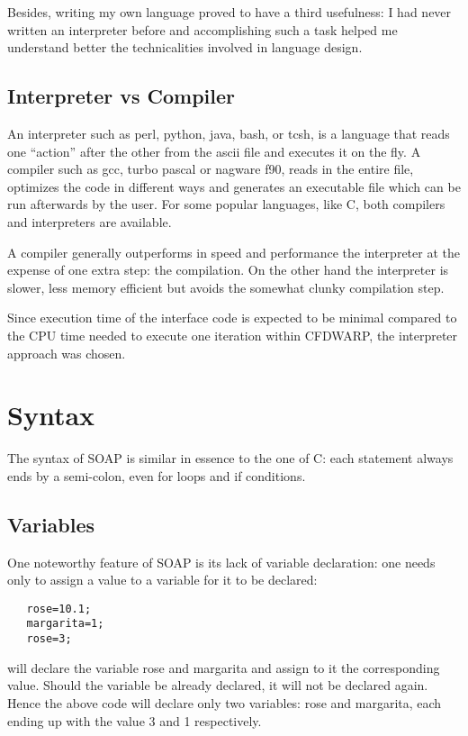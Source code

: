 \documentclass{warpdoc}
\begin{document}
Besides, writing my own language proved to have a third usefulness: I had never written an interpreter before
and accomplishing such a task helped me understand better the technicalities 
involved in language design.


\subsection{Interpreter vs Compiler}

An interpreter such as perl, python, java, bash, or tcsh, is a language that
reads one ``action'' after the other
from the ascii file and executes it on the fly. A compiler such as gcc, turbo pascal
or nagware f90, reads in the
entire file, optimizes the code in different ways and generates an executable
file which can be run afterwards by the user. For some popular languages, like
C, both compilers and interpreters are available.

A compiler generally outperforms
in speed and performance the interpreter at the expense of one extra
step: the compilation. On the other hand the interpreter is slower, less
memory efficient but avoids the somewhat clunky compilation step.

Since execution time of the interface code is expected to be minimal
compared to the CPU time needed to execute one iteration within CFDWARP, the interpreter
approach was chosen.


\section{Syntax}

The syntax of SOAP is similar in essence to the one of C: each statement
always ends by a semi-colon, even for loops and if conditions.

\subsection{Variables}

One noteworthy feature of SOAP is its lack of variable declaration: one needs only
to assign a value to a variable for it to be declared:
%
\begin{verbatim}
   rose=10.1;
   margarita=1;
   rose=3;
\end{verbatim}
%
will declare the variable rose and margarita
and assign to it the corresponding value. Should the variable be already declared,
it will not be declared again. Hence the above code will declare only two variables:
rose and margarita, each ending up with the value 3 and 1 respectively.
\end{document}
